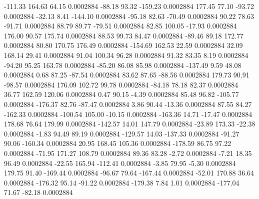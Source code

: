      -111.33      164.63       64.15     0.0002884
      -88.18       93.32     -159.23     0.0002884
      177.45       77.10      -93.72     0.0002884
      -32.13        8.41     -144.10     0.0002884
      -95.18       82.63      -70.49     0.0002884
       90.22       78.63      -91.71     0.0002884
       88.79       89.77      -79.51     0.0002884
       82.85      100.05      -17.93     0.0002884
      176.00       90.57      175.74     0.0002884
       88.53       99.73       84.47     0.0002884
      -89.46       89.18      172.77     0.0002884
       80.80      170.75      176.49     0.0002884
     -154.69      162.53       22.59     0.0002884
       32.09      168.14       29.41     0.0002884
       91.04      100.34       96.28     0.0002884
       91.32       83.35        8.19     0.0002884
      -94.20       95.25      163.78     0.0002884
      -85.20       86.08       85.98     0.0002884
     -137.49        9.59       48.08     0.0002884
        0.68       87.25      -87.54     0.0002884
       83.62       87.65      -88.56     0.0002884
      179.73       90.91      -98.57     0.0002884
      176.09      102.72       99.78     0.0002884
      -84.18       78.18       82.37     0.0002884
       36.77      162.59      120.06     0.0002884
        0.47       90.15       -4.39     0.0002884
       85.48       96.82     -105.77     0.0002884
     -176.37       82.76      -87.47     0.0002884
        3.86       90.44      -13.36     0.0002884
       87.55       84.27     -162.33     0.0002884
     -100.54      105.00      -10.15     0.0002884
     -163.36       14.71      -17.47     0.0002884
      178.68       76.64      179.99     0.0002884
     -142.57       14.01      147.79     0.0002884
      -23.89      173.33      -22.38     0.0002884
       -1.83       94.49       89.19     0.0002884
     -129.57       14.03     -137.33     0.0002884
      -91.27       90.06     -160.34     0.0002884
       20.95      168.45      105.36     0.0002884
     -178.59       86.75       97.22     0.0002884
      -71.95      171.27      108.79     0.0002884
       89.36       83.28       -2.72     0.0002884
       -7.21       18.35       96.49     0.0002884
      -22.55      165.94     -112.41     0.0002884
       -3.85       79.95       -5.30     0.0002884
      179.75       91.40     -169.44     0.0002884
      -96.67       79.64     -167.44     0.0002884
      -52.01      170.88       36.64     0.0002884
     -176.32       95.14      -91.22     0.0002884
     -179.38        7.84        1.01     0.0002884
     -177.04       71.67      -82.18     0.0002884
